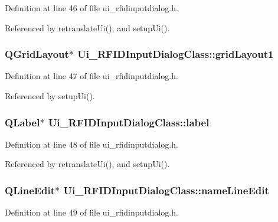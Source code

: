 Definition at line 46 of file ui\_\-rfidinputdialog.h.

Referenced by retranslateUi(), and setupUi().\hypertarget{class_ui___r_f_i_d_input_dialog_class_12b80532d37583f10c224daf1560a44e}{
\subsubsection[gridLayout1]{\setlength{\rightskip}{0pt plus 5cm}QGridLayout$\ast$ {\bf Ui\_\-RFIDInputDialogClass::gridLayout1}}}
\label{class_ui___r_f_i_d_input_dialog_class_12b80532d37583f10c224daf1560a44e}




Definition at line 47 of file ui\_\-rfidinputdialog.h.

Referenced by setupUi().\hypertarget{class_ui___r_f_i_d_input_dialog_class_fe19f4f88155fcb3579718339d55c790}{
\subsubsection[label]{\setlength{\rightskip}{0pt plus 5cm}QLabel$\ast$ {\bf Ui\_\-RFIDInputDialogClass::label}}}
\label{class_ui___r_f_i_d_input_dialog_class_fe19f4f88155fcb3579718339d55c790}




Definition at line 48 of file ui\_\-rfidinputdialog.h.

Referenced by retranslateUi(), and setupUi().\hypertarget{class_ui___r_f_i_d_input_dialog_class_168853345738013708c4d46f3f3f84c0}{
\subsubsection[nameLineEdit]{\setlength{\rightskip}{0pt plus 5cm}QLineEdit$\ast$ {\bf Ui\_\-RFIDInputDialogClass::nameLineEdit}}}
\label{class_ui___r_f_i_d_input_dialog_class_168853345738013708c4d46f3f3f84c0}




Definition at line 49 of file ui\_\-rfidinputdialog.h.

